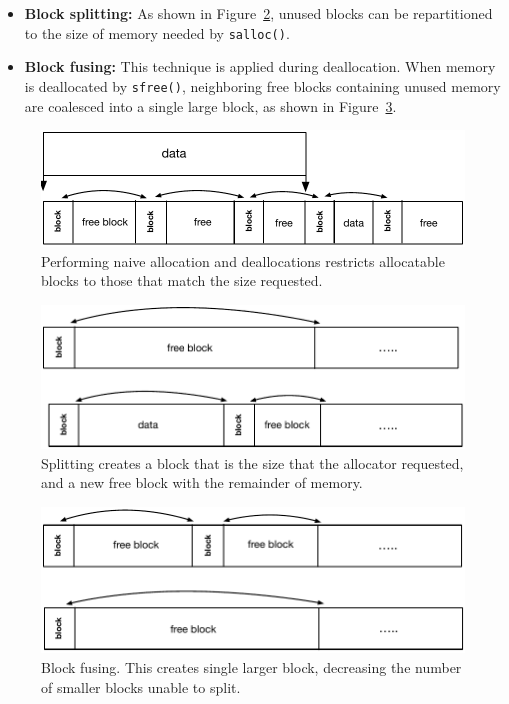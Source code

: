 \begin{itemize}
\item \textbf{Block splitting:} As shown in Figure~\ref{fig:split}, unused blocks can be repartitioned to the size of memory needed by \texttt{salloc()}.
\item \textbf{Block fusing:}
This technique is applied during deallocation. When memory is deallocated by \texttt{sfree()}, neighboring free blocks containing unused memory are coalesced into a single large block, as shown in Figure~\ref{fig:fuse}.
\end{itemize} 



\begin{figure}[!htb]
\centering
\includegraphics[scale=.55]{figs/fragmentation.pdf}
\caption{Performing naive allocation and deallocations restricts allocatable blocks to those that match the size requested.}
\label{fig:fragmentation}
\end{figure}

\begin{figure}[!htb]
\centering
\includegraphics[scale=.55]{figs/split.pdf}
\caption{Splitting creates a block that is the size that the allocator requested, and a new free block with the remainder of memory.}
\label{fig:split}
\end{figure}


\begin{figure}[!htb]
\centering
\includegraphics[scale=.55]{figs/fuse.pdf}
\caption{Block fusing. This creates single larger block, decreasing the number of smaller blocks unable to split.}
\label{fig:fuse}
\end{figure}

%
%
